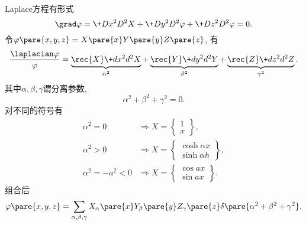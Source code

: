 \documentclass[hidelinks]{ctexart}
\begin{document}
Laplace方程有形式
\[ \grad \varphi = \+D{x^2}D{^2X} + \+D{y^2}D{^2\varphi} + \+D{z^2}D{^2\varphi} = 0. \]
令$\displaystyle \varphi\pare{x,y,z} = X\pare{x}Y\pare{y}Z\pare{z}$, 有
\[ \frac{\laplacian\varphi}{\varphi} = \underbrace{\rec{X}\+d{x^2}d{^2X}}_{\alpha^2} + \underbrace{\rec{Y}\+d{y^2}d{^2Y}}_{\beta^2} + \underbrace{\rec{Z}\+d{z^2}d{^2Z}}_{\gamma^2}. \]
其中$\alpha,\beta,\gamma$谓分离参数, 
\[ \alpha^2 + \beta^2 + \gamma^2 = 0. \]
对不同的符号有
\begin{align*}
    \alpha^2 = 0 &\Rightarrow X = \left\{\begin{aligned}
    1 \\ x
    \end{aligned} \right\},\\
    \alpha^2 > 0 &\Rightarrow X = \left\{\begin{aligned}
    \cosh \alpha x \\ \sinh \alpha h
    \end{aligned} \right\},\\
    \alpha^2 = -a^2 < 0 &\Rightarrow X = \left\{\begin{aligned}
    \cos ax \\ \sin ax
    \end{aligned} \right\}.
\end{align*}
组合后
\[ \varphi\pare{x,y,z} = \sum_{\alpha,\beta,\gamma} X_\alpha\pare{x} Y_\beta\pare{y} Z_\gamma\pare{z} \delta\pare{\alpha^2 + \beta^2 + \gamma^2}. \]
\begin{figure}[ht]
    \centering
    \caption{}
    \label{fig:方块laplacian}
\end{figure}
\end{document}
